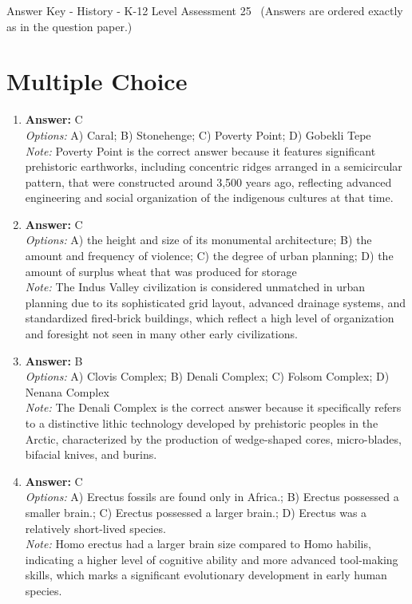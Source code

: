 \documentclass[12pt]{article}
\begin{document}
\begin{center}
Answer Key - History - K-12 Level Assessment 25 \
\small (Answers are ordered exactly as in the question paper.)
\end{center}

\section*{Multiple Choice}
\begin{enumerate}[label=\arabic*.]
\item \textbf{Answer:} C
\\ \textit{Options:} A) Caral; B) Stonehenge; C) Poverty Point; D) Gobekli Tepe
\\ \textit{Note:} Poverty Point is the correct answer because it features significant prehistoric earthworks, including concentric ridges arranged in a semicircular pattern, that were constructed around 3,500 years ago, reflecting advanced engineering and social organization of the indigenous cultures at that time.
\item \textbf{Answer:} C
\\ \textit{Options:} A) the height and size of its monumental architecture; B) the amount and frequency of violence; C) the degree of urban planning; D) the amount of surplus wheat that was produced for storage
\\ \textit{Note:} The Indus Valley civilization is considered unmatched in urban planning due to its sophisticated grid layout, advanced drainage systems, and standardized fired-brick buildings, which reflect a high level of organization and foresight not seen in many other early civilizations.
\item \textbf{Answer:} B
\\ \textit{Options:} A) Clovis Complex; B) Denali Complex; C) Folsom Complex; D) Nenana Complex
\\ \textit{Note:} The Denali Complex is the correct answer because it specifically refers to a distinctive lithic technology developed by prehistoric peoples in the Arctic, characterized by the production of wedge-shaped cores, micro-blades, bifacial knives, and burins.
\item \textbf{Answer:} C
\\ \textit{Options:} A) Erectus fossils are found only in Africa.; B) Erectus possessed a smaller brain.; C) Erectus possessed a larger brain.; D) Erectus was a relatively short-lived species.
\\ \textit{Note:} Homo erectus had a larger brain size compared to Homo habilis, indicating a higher level of cognitive ability and more advanced tool-making skills, which marks a significant evolutionary development in early human species.

\end{enumerate}
\end{document}
